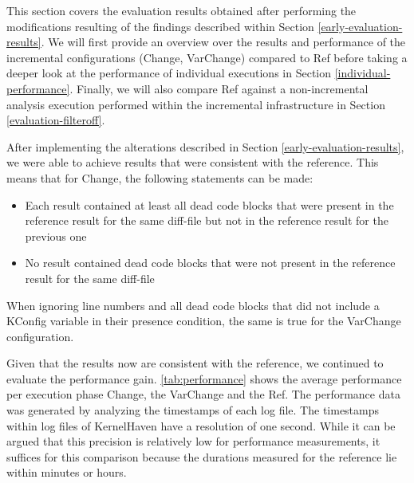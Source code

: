 \documentclass[a4paper]{article}
\begin{document}
This section covers the evaluation results obtained after performing the modifications resulting of the findings described within Section \ref{early-evaluation-results}. We will first provide an overview over the results and performance of the incremental configurations (Change, VarChange) compared to Ref before taking a deeper look at the performance of individual executions in Section \ref{individual-performance}. Finally, we will also compare Ref against a non-incremental analysis execution performed within the incremental infrastructure in Section \ref{evaluation-filteroff}. 

After implementing the alterations described in Section \ref{early-evaluation-results}, we were able to achieve results that were consistent with the reference. This means that for Change, the following statements can be made:

\begin{itemize}
   \item Each result contained at least all dead code blocks that were present in the reference result for the same diff-file but not in the reference result for the previous one
   \item No result contained dead code blocks that were not present in the reference result for the same diff-file
\end{itemize}

When ignoring line numbers and all dead code blocks that did not include a KConfig variable in their presence condition, the same is true for the VarChange configuration. 

Given that the results now are consistent with the reference, we continued to evaluate the performance gain. \autoref{tab:performance} shows the average performance per execution phase Change, the VarChange and the Ref. The performance data was generated by analyzing the timestamps of each log file. The timestamps within log files of KernelHaven have a resolution of one second. While it can be argued that this precision is relatively low for performance measurements, it suffices for this comparison because the durations measured for the reference lie within minutes or hours.
\end{document}
